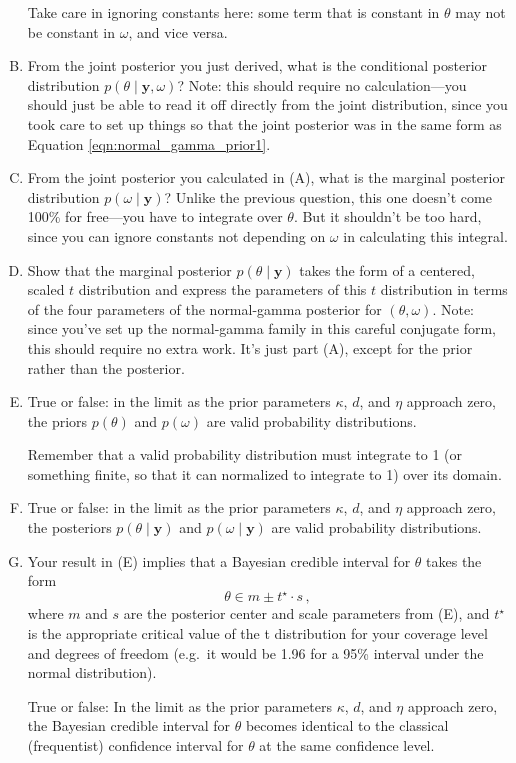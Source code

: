 \documentclass{mynotes}
\newcommand{\by}{\textbf{y}}
\begin{document}
\begin{enumerate}[(A)]
Take care in ignoring constants here: some term that is constant in $\theta$ may not be constant in $\omega$, and vice versa.  


\item From the joint posterior you just derived, what is the conditional posterior distribution $p(\theta \mid \by, \omega)$?  Note: this should require no calculation---you should just be able to read it off directly from the joint distribution, since you took care to set up things so that the joint posterior was in the same form as Equation \ref{eqn:normal_gamma_prior1}.

\item From the joint posterior you calculated in (A), what is the marginal posterior distribution $p(\omega \mid \by)$?  Unlike the previous question, this one doesn't come 100\% for free---you have to integrate over $\theta$.  But it shouldn't be too hard, since you can ignore constants not depending on $\omega$ in calculating this integral.

\item Show that the marginal posterior $p(\theta \mid \by)$ takes the form of a centered, scaled $t$ distribution and express the parameters of this $t$ distribution in terms of the four parameters of the normal-gamma posterior for $(\theta, \omega)$.  Note: since you've set up the normal-gamma family in this careful conjugate form, this should require no extra work.  It's just part (A), except for the prior rather than the posterior.

\item True or false: in the limit as the prior parameters $\kappa$, $d$, and $\eta$ approach zero, the priors $p(\theta)$ and $p(\omega)$ are valid probability distributions.

Remember that a valid probability distribution must integrate to 1 (or something finite, so that it can normalized to integrate to 1) over its domain.

\item True or false: in the limit as the prior parameters $\kappa$, $d$, and $\eta$ approach zero, the posteriors $p(\theta \mid \by)$ and $p(\omega \mid \by)$ are valid probability distributions.

\item Your result in (E) implies that a Bayesian credible interval for $\theta$ takes the form
$$
\theta \in m \pm t^{\star} \cdot s \, ,
$$
where $m$ and $s$ are the posterior center and scale parameters from (E), and $t^\star$ is the appropriate critical value of the t distribution for your coverage level and degrees of freedom (e.g.~it would be 1.96 for a 95\% interval under the normal distribution).

True or false: In the limit as the prior parameters $\kappa$, $d$, and $\eta$ approach zero, the Bayesian credible interval for $\theta$ becomes identical to the classical (frequentist) confidence interval for $\theta$ at the same confidence level.

\end{enumerate}
\end{document}
